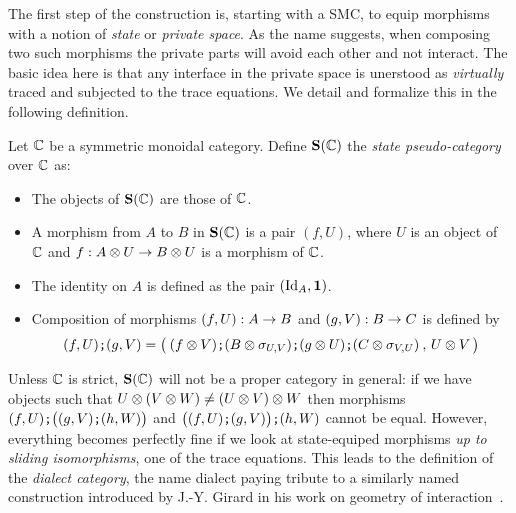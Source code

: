 

The first step of the construction is, starting with a SMC, to equip morphisms with a notion of
\emph{state} or \emph{private space}. As the name suggests, when composing two such morphisms
the private parts will avoid each other and not interact. The basic idea here is that any interface
in the private space is unerstood as \emph{virtually} traced and subjected to the trace equations.
We detail and formalize this in the following definition.

\begin{definition}
	Let $\mathbb{C}$ be a symmetric monoidal category. Define $\mathbf S(\mathbb{C})$ the \emph{state 
	pseudo\footnotemark-category}
	over $\mathbb{C}$ as:
	\begin{itemize}
		\item The objects of $\mathbf S(\mathbb{C})$ are those of $\mathbb{C}$.
		\item A morphism from $A$ to $B$ in $\mathbf S(\mathbb{C})$ is a pair $(f,U)$,
		where $U$ is an object of $\mathbb{C}$ and $f:A\otimes U\rightarrow B\otimes U$ is a morphism of 
		$\mathbb{C}$.
		\item The identity on $A$ is defined as the pair $(\mbox{\normalfont Id}_A, \mathbf 1)$.
		\item Composition of morphisms $(f,U):A\rightarrow B$ and $(g,V):B\rightarrow C$ is defined by
		$$(f,U)\textbf{\tt;}(g,V)=\big(\:
		( f\otimes V)\textbf{\tt;}(B\otimes \sigma_{U,V})\textbf{\tt;}(g\otimes U)\textbf{\tt;}(C\otimes\sigma_{V,U})
		\:,\,U\otimes V\,\big)$$
	\end{itemize}
\end{definition}

Unless $\mathbb{C}$ is strict, $\mathbf S(\mathbb{C})$ will not be a proper category in general: if we have objects
such that $U\otimes (V\otimes W)\neq (U\otimes V)\otimes W$ then morphisms
$(f,U) \textbf{\tt;} \big((g,V) \textbf{\tt;} (h,W)\big)$ and $\big((f,U) \textbf{\tt;} (g,V)\big) \textbf{\tt;} (h,W)$ cannot be equal.
However, everything becomes  perfectly fine if we look at state-equiped morphisms 
\emph{up to sliding isomorphisms}, one of the trace equations. This leads to the definition of the
\emph{dialect category}, the name dialect paying tribute to a similarly named construction introduced
by J.-Y. Girard in his work on geometry of interaction~\cite{girard95}.

